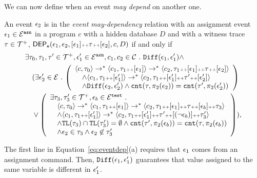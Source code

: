 We can now define when an event \emph{may depend} on another one.
\begin{defn}
\label{def:event_dep}
An event $\mathtt{\epsilon}_2$ is in the \emph{event may-dependency} relation with an assignment event $\mathtt{\epsilon}_1 \in \mathcal{E}^{\mathtt{{asn}}}$ in a program ${c}$ 
with a hidden database $D$ and 
with a witness trace $\mathtt{\tau} \in \mathcal{T}^{+}$,
$\mathsf{DEP_{\mathtt{e}}}(\mathtt{\epsilon}_1, \mathtt{\epsilon}_2, [\mathtt{\epsilon}_1] {\scriptscriptstyle ++} \mathtt{\tau} {\scriptscriptstyle ++} [\mathtt{\epsilon}_2], c, D)$ if and only if
\begin{subequations}
\begin{align}
 & 
 \exists \trace_0, \trace_1, \trace' \in \ftdom,\event_1' \in \eventset^{\asn}, {c}_1, {c}_2 \in \cdom \sthat \diff(\event_1, \event_1') \land \\
 & 
 \quad (\exists \event_2' \in \eventset \sthat
 \left(
 \begin{array}{l} 
 \config{{c}, \trace_0} \rightarrow^{*} 
 \config{{c}_1, \trace_1 \tracecat [\event_1]} \rightarrow^{*} 
 \config{{c}_2, \trace_1 \tracecat [\event_1] \tracecat \trace \tracecat [\event_2] } 
 \\ 
 \quad \land
 \config{{c}_1, \trace_1 \tracecat [\event_1']} \rightarrow^{*}
 \config{{c}_2, \trace_1 \tracecat[ \event_1'] \tracecat \trace' \tracecat [\event_2'] } 
 \\
 \quad \land
 \diff(\event_2,\event_2' ) \land 
 \vcounter(\trace, \pi_2(\event_2))
 = 
 \vcounter(\trace', \pi_2(\event_2'))\\
 \end{array}
 \right)\\ 
 & 
 \quad
 \lor 
 \left(
 \begin{array}{l} 
 \exists \trace_3, \trace_3' \in \ftdom, \event_b \in \eventset^{\test} \sthat 
 \\
 \quad \config{{c}, \trace_0} \rightarrow^{*} \config{{c}_1, \trace_1 \tracecat [\event_1]} \rightarrow^{*}
 \config{c_2, \trace_1 \tracecat [\event_1] \tracecat
 \trace \tracecat [\event_b] \tracecat \trace_3} 
 \\ \quad \land
 \config{{c}_1, \trace_1 \tracecat [\event_1']} \rightarrow^{*} 
 \config{c_2, \trace_1 \tracecat [\event_1'] \tracecat \trace' \tracecat [(\neg \event_b)] \tracecat \trace_3'} 
 \\
 \quad \land \tlabel({\trace_3}) \cap \tlabel({\trace_3'})
 = \emptyset
 \land \vcounter(\trace', \pi_2(\event_b)) = \vcounter(\trace, \pi_2(\event_b)) 
 \\
 \quad 
 \land \event_2 \in \trace_3
 \land \event_2 \not\in \trace_3'
 \end{array}
 \right)
 ),
\end{align}
\label{eq:eventdep}
\end{subequations}
\end{defn}
The first line in Equation~\ref{eq:eventdep}(a) requires that $\mathtt{\epsilon}_1$ comes from an assignment command.
Then, $\mathtt{Diff}(\mathtt{\epsilon}_1, \mathtt{\epsilon}_1')$ guarantees that value assigned to the same variable is different in $\mathtt{\epsilon}_1'$.


